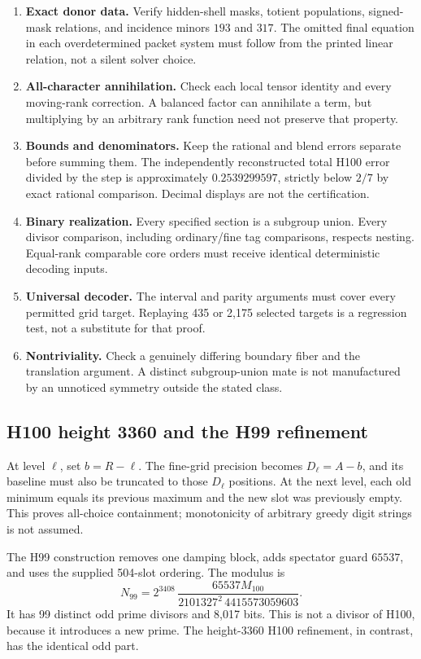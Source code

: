 \documentclass[10pt]{article}
\begin{document}
\begin{enumerate}
\item \textbf{Exact donor data.} Verify hidden-shell masks, totient
populations, signed-mask relations, and incidence minors $193$ and $317$.
The omitted final equation in each overdetermined packet system must
follow from the printed linear relation, not a silent solver choice.
\item \textbf{All-character annihilation.} Check each local tensor
identity and every moving-rank correction. A balanced factor can
annihilate a term, but multiplying by an arbitrary rank function need
not preserve that property.
\item \textbf{Bounds and denominators.} Keep the rational and blend
errors separate before summing them. The independently reconstructed
total H100 error divided by the step is approximately $0.2539299597$,
strictly below $2/7$ by exact rational comparison. Decimal displays are
not the certification.
\item \textbf{Binary realization.} Every specified section is a
subgroup union. Every divisor comparison, including ordinary/fine tag
comparisons, respects nesting. Equal-rank comparable core orders must
receive identical deterministic decoding inputs.
\item \textbf{Universal decoder.} The interval and parity arguments
must cover every permitted grid target. Replaying 435 or 2,175 selected
targets is a regression test, not a substitute for that proof.
\item \textbf{Nontriviality.} Check a genuinely differing boundary
fiber and the translation argument. A distinct subgroup-union mate is
not manufactured by an unnoticed symmetry outside the stated class.
\end{enumerate}

\subsection{H100 height 3360 and the H99 refinement}
At level $\ell$, set $b=R-\ell$. The fine-grid precision becomes
$D_\ell=A-b$, and its baseline must also be truncated to those
$D_\ell$ positions. At the next level, each old minimum equals its
previous maximum and the new slot was previously empty. This proves
all-choice containment; monotonicity of arbitrary greedy digit strings
is not assumed.

The H99 construction removes one damping block, adds spectator guard
$65537$, and uses the supplied 504-slot ordering. The modulus is
\[
 N_{99}=2^{3408}\,\frac{65537M_{100}}
 {2101327^2\,4415573059603}.
\]
It has 99 distinct odd prime divisors and 8,017 bits. This is not a
divisor of H100, because it introduces a new prime. The height-3360
H100 refinement, in contrast, has the identical odd part.
\end{document}

